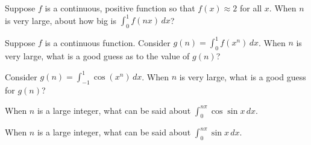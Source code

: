 \documentclass{ximera}
\newcommand{\recommendation}[1]{}
\begin{document}
\begin{shuffle}
\begin{problem}
  Suppose $f$ is a continuous, positive function so that $f(x) \approx 2$ for all $x$.  When $n$ is very large, about how big is $\int_0^1 f(nx) \, dx$?
  \begin{multipleChoice}
   \end{multipleChoice}
\end{problem}

\begin{problem}
  Suppose $f$ is a continuous function.  Consider $g(n) = \int_0^1 f(x^n) \, dx$.  When $n$ is very large, what is a good guess as to the value of $g(n)$?
  \begin{multipleChoice}
  \end{multipleChoice}
\end{problem}

\begin{problem}
  Consider $g(n) = \int_{-1}^1 \cos(x^n) \, dx$.  When $n$ is very large, what is a good guess for $g(n)$?
  \begin{multipleChoice}
  \end{multipleChoice}
\end{problem}

\begin{problem}
  When $n$ is a large integer, what can be said about $\int_0^{n \pi} \cos \sin x \, dx$.
  \begin{multipleChoice}
  \end{multipleChoice}
\end{problem}

\begin{problem}
  When $n$ is a large integer, what can be said about $\int_0^{n \pi} \sin x \, dx$.
  \begin{multipleChoice}
  \end{multipleChoice}
\end{problem}


\end{shuffle}
\end{document}
